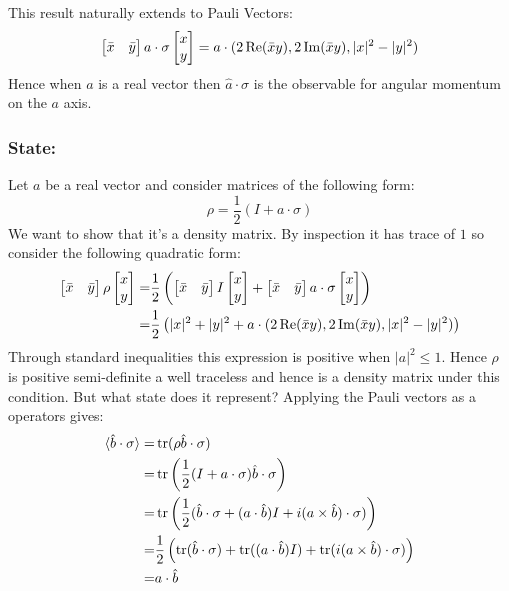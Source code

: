This result naturally extends to Pauli Vectors:
\[\begin{aligned}
	\begin{bmatrix}\bar{x}&\bar{y}\end{bmatrix}a\cdot\sigma\begin{bmatrix}x\\y\end{bmatrix}
	=a\cdot(2\operatorname{Re}(\bar{x}y),2\operatorname{Im}(\bar{x}y),|x|^2-|y|^2)\\
\end{aligned}\]
Hence when $a$ is a real vector then $\hat{a}\cdot\sigma$ is the observable for angular momentum on the $a$ axis.

\subsubsection{State:}
Let $a$ be a real vector and consider matrices of the following form:
\[\rho = \frac{1}{2}(I+a\cdot\sigma)\]
We want to show that it's a density matrix.
By inspection it has trace of $1$ so consider the following quadratic form:
\[\begin{aligned}
	\begin{bmatrix}\bar{x}&\bar{y}\end{bmatrix}\rho\begin{bmatrix}x\\y\end{bmatrix}
	=&\frac{1}{2}\left(\begin{bmatrix}\bar{x}&\bar{y}\end{bmatrix}I\begin{bmatrix}x\\y\end{bmatrix}+\begin{bmatrix}\bar{x}&\bar{y}\end{bmatrix}a\cdot\sigma\begin{bmatrix}x\\y\end{bmatrix}\right)\\
	=&\frac{1}{2}\left(|x|^2+|y|^2+a\cdot(2\operatorname{Re}(\bar{x}y),2\operatorname{Im}(\bar{x}y),|x|^2-|y|^2)\right)\\
\end{aligned}\]
Through standard inequalities this expression is positive when $|a|^2\leq 1$.
Hence $\rho$ is positive semi-definite a well traceless and hence is a density matrix under this condition.
But what state does it represent?
Applying the Pauli vectors as a operators gives:
\[\begin{aligned}
	\langle \hat{b}\cdot\sigma\rangle =& \operatorname{tr}(\rho \hat{b}\cdot\sigma)\\
	=&\operatorname{tr}\left(\frac{1}{2}(I+a\cdot\sigma)\hat{b}\cdot\sigma\right)\\
	=&\operatorname{tr}\left(\frac{1}{2}(\hat{b}\cdot\sigma+(a\cdot \hat{b})I+i(a\times \hat{b})\cdot\sigma)\right)\\
	=&\frac{1}{2}\left(\operatorname{tr}(\hat{b}\cdot\sigma)+\operatorname{tr}((a\cdot \hat{b})I)+\operatorname{tr}(i(a\times \hat{b})\cdot\sigma)\right)\\
	=&a\cdot \hat{b}\\
\end{aligned}\]
